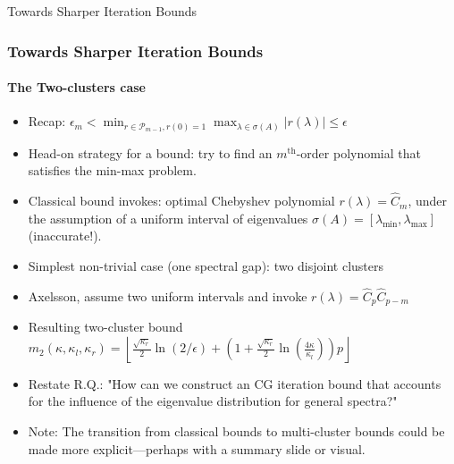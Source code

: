 \begin{frame}[label=two_clusters]{Towards Sharper Iteration Bounds}
    \frametitle{Towards Sharper Iteration Bounds}
    \framesubtitle{The Two-clusters case}
        \fontsize{8}{8}\selectfont
        \begin{itemize}
            \item<1-> Recap: $\epsilon_m < \min_{r \in \mathcal{P}_{m-1}, r(0) = 1} \max_{\lambda \in \sigma(A)} |r(\lambda)| \leq \epsilon$
            \item<2-> Head-on strategy for a bound: try to find an $m^{\text{th}}$-order polynomial that satisfies the min-max problem.
            \item<3-> Classical bound invokes: optimal Chebyshev polynomial $r(\lambda) = \hat{C}_m$, under the assumption of a uniform interval of eigenvalues $\sigma(A) = [\lambda_{\min}, \lambda_{\max}]$ (inaccurate!).
            \item<4-> Simplest non-trivial case (one spectral gap): two disjoint clusters
            \item<5-> Axelsson, assume two uniform intervals and invoke $r(\lambda) = \hat{C}_{p}\hat{C}_{p-m}$
            \item<6-> Resulting two-cluster bound $m_2(\kappa, \kappa_l, \kappa_r)=\left\lfloor\frac{\sqrt{\kappa_r}}{2} \ln (2 / \epsilon)+\left(1+\frac{\sqrt{\kappa_r}}{2} \ln \left(\frac{4\kappa}{\kappa_l}\right)\right) p\right\rfloor$
            \item<7-> Restate R.Q.: "How can we construct an CG iteration bound that accounts for the influence of the eigenvalue distribution for general spectra?"
            \item<8-> Note: The transition from classical bounds to multi-cluster bounds could be made more explicit—perhaps with a summary slide or visual.
        \end{itemize}
\end{frame}